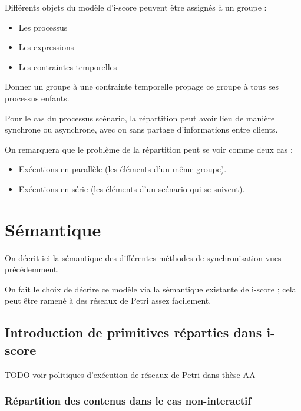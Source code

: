 \documentclass{article}
\begin{document}
Différents objets du modèle d'i-score peuvent être assignés à un groupe : 

\begin{itemize}
	\item Les processus
	\item Les expressions
	\item Les contraintes temporelles
\end{itemize}

Donner un groupe à une contrainte temporelle propage ce groupe à tous ses processus enfants.

Pour le cas du processus scénario, la répartition peut avoir lieu de manière synchrone ou asynchrone, 
avec ou sans partage d'informations entre clients.

On remarquera que le problème de la répartition peut se voir comme deux cas : 
\begin{itemize}
	\item Exécutions en parallèle (les éléments d'un même groupe).
	\item Exécutions en série (les éléments d'un scénario qui se suivent).
\end{itemize}

\section{Sémantique}\label{sec.semantique}
On décrit ici la sémantique des différentes méthodes de synchronisation vues précédemment.

On fait le choix de décrire ce modèle via la sémantique existante de i-score ; cela peut être ramené à des réseaux de Petri assez facilement.


\subsection{Introduction de primitives réparties dans i-score}
TODO voir politiques d'exécution de réseaux de Petri dans thèse AA

\subsubsection{Répartition des contenus dans le cas non-interactif}
\begin{figure}[h]
    \centering
    \begin{tikzpicture}
    
    \end{tikzpicture}
    \label{scenar.simple}
\end{figure}
\end{document}

